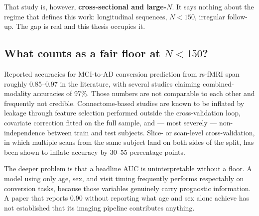 That study is, however, \textbf{cross-sectional and large-$N$}. It says nothing about the
regime that defines this work: longitudinal sequences, $N < 150$, irregular follow-up. The
gap is real and this thesis occupies it.


\subsection{What counts as a fair floor at $N < 150$?}
\label{sec:gap-floors}

Reported accuracies for MCI-to-AD conversion prediction from rs-fMRI span roughly
0.85--0.97 in the literature, with several studies claiming combined-modality accuracies
of 97\%. Those numbers are not comparable to each other and frequently not credible.
Connectome-based studies are known to be inflated by leakage through feature selection
performed outside the cross-validation loop, covariate correction fitted on the full
sample, and --- most severely --- non-independence between train and test subjects. Slice-
or scan-level cross-validation, in which multiple scans from the same subject land on both
sides of the split, has been shown to inflate accuracy by 30--55 percentage points.

The deeper problem is that a headline AUC is uninterpretable without a floor. A model
using only age, sex, and visit timing frequently performs respectably on conversion tasks,
because those variables genuinely carry prognostic information. A paper that reports 0.90
without reporting what age and sex alone achieve has not established that its imaging
pipeline contributes anything.


